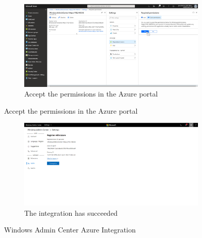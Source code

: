 \begin{figure}[h]\ContinuedFloat
\begin{subfigure}{\textwidth}
		\captionsetup{width=0.7\linewidth}
		\includegraphics[width=0.75\linewidth]{img/StandVanZaken/WAC3.png} 
		\centering
		\caption{Accept the permissions in the Azure portal}
		\label{fig:WACAzure5}
	\end{subfigure}
\end{figure}
\begin{figure}[h]\ContinuedFloat
	\begin{subfigure}{\textwidth}
		\captionsetup{width=0.7\linewidth}
		\includegraphics[width=0.75\linewidth]{img/StandVanZaken/WAC4.png}
		\centering
		\caption{The integration has succeeded}
		\label{fig:WACAzure6}
	\end{subfigure}
	\caption{Windows Admin Center Azure Integration}
	\label{fig:WACAzure}
\end{figure}
